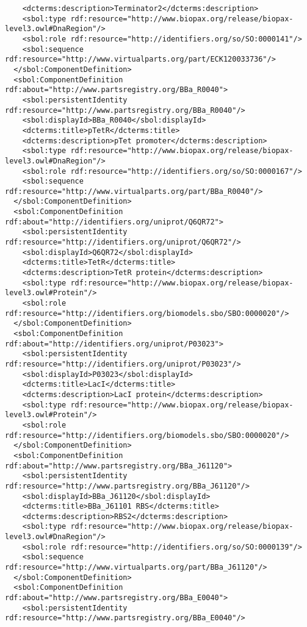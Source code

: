 \begin{lstlisting}
    <dcterms:description>Terminator2</dcterms:description>
    <sbol:type rdf:resource="http://www.biopax.org/release/biopax-level3.owl#DnaRegion"/>
    <sbol:role rdf:resource="http://identifiers.org/so/SO:0000141"/>
    <sbol:sequence rdf:resource="http://www.virtualparts.org/part/ECK120033736"/>
  </sbol:ComponentDefinition>
  <sbol:ComponentDefinition rdf:about="http://www.partsregistry.org/BBa_R0040">
    <sbol:persistentIdentity rdf:resource="http://www.partsregistry.org/BBa_R0040"/>
    <sbol:displayId>BBa_R0040</sbol:displayId>
    <dcterms:title>pTetR</dcterms:title>
    <dcterms:description>pTet promoter</dcterms:description>
    <sbol:type rdf:resource="http://www.biopax.org/release/biopax-level3.owl#DnaRegion"/>
    <sbol:role rdf:resource="http://identifiers.org/so/SO:0000167"/>
    <sbol:sequence rdf:resource="http://www.virtualparts.org/part/BBa_R0040"/>
  </sbol:ComponentDefinition>
  <sbol:ComponentDefinition rdf:about="http://identifiers.org/uniprot/Q6QR72">
    <sbol:persistentIdentity rdf:resource="http://identifiers.org/uniprot/Q6QR72"/>
    <sbol:displayId>Q6QR72</sbol:displayId>
    <dcterms:title>TetR</dcterms:title>
    <dcterms:description>TetR protein</dcterms:description>
    <sbol:type rdf:resource="http://www.biopax.org/release/biopax-level3.owl#Protein"/>
    <sbol:role rdf:resource="http://identifiers.org/biomodels.sbo/SBO:0000020"/>
  </sbol:ComponentDefinition>
  <sbol:ComponentDefinition rdf:about="http://identifiers.org/uniprot/P03023">
    <sbol:persistentIdentity rdf:resource="http://identifiers.org/uniprot/P03023"/>
    <sbol:displayId>P03023</sbol:displayId>
    <dcterms:title>LacI</dcterms:title>
    <dcterms:description>LacI protein</dcterms:description>
    <sbol:type rdf:resource="http://www.biopax.org/release/biopax-level3.owl#Protein"/>
    <sbol:role rdf:resource="http://identifiers.org/biomodels.sbo/SBO:0000020"/>
  </sbol:ComponentDefinition>
  <sbol:ComponentDefinition rdf:about="http://www.partsregistry.org/BBa_J61120">
    <sbol:persistentIdentity rdf:resource="http://www.partsregistry.org/BBa_J61120"/>
    <sbol:displayId>BBa_J61120</sbol:displayId>
    <dcterms:title>BBa_J61101 RBS</dcterms:title>
    <dcterms:description>RBS2</dcterms:description>
    <sbol:type rdf:resource="http://www.biopax.org/release/biopax-level3.owl#DnaRegion"/>
    <sbol:role rdf:resource="http://identifiers.org/so/SO:0000139"/>
    <sbol:sequence rdf:resource="http://www.virtualparts.org/part/BBa_J61120"/>
  </sbol:ComponentDefinition>
  <sbol:ComponentDefinition rdf:about="http://www.partsregistry.org/BBa_E0040">
    <sbol:persistentIdentity rdf:resource="http://www.partsregistry.org/BBa_E0040"/>

\end{lstlisting}
